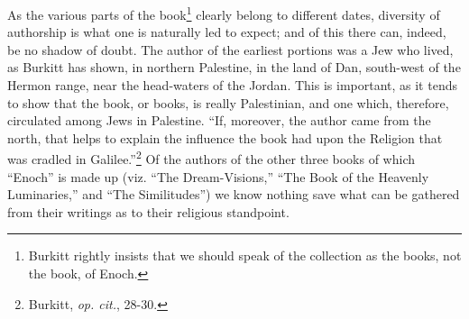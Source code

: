 
As the various parts of the book\footnote{Burkitt rightly insists that we should speak of the collection
as the books, not the book, of Enoch.} clearly belong to
different dates, diversity of authorship is what one
is naturally led to expect; and of this there can,
indeed, be no shadow of doubt. The author of the
earliest portions was a Jew who lived, as Burkitt
has shown, in northern Palestine, in the land of Dan,
south-west of the Hermon range, near the head-waters
of the Jordan. This is important, as it tends
to show that the book, or books, is really Palestinian,
and one which, therefore, circulated among Jews
in Palestine. “If, moreover, the author came from
the north, that helps to explain the influence the book
had upon the Religion that was cradled in Galilee.”\footnote{Burkitt, \emph{op. cit.}, 28-30.}
Of the authors of the other three books of which
“Enoch” is made up (viz. “The Dream-Visions,”
“The Book of the Heavenly Luminaries,” and “The
Similitudes”) we know nothing save what can be
gathered from their writings as to their religious
standpoint.

